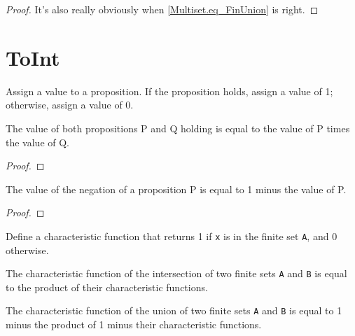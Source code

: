 \begin{proof}
    \leanok
    It's also really obviously when \ref{Multiset.eq_FinUnion} is right.
\end{proof}
\section{ToInt}

\begin{definition}\label{toInt}
  \leanok
  Assign a value to a proposition. If the proposition holds, assign a value of 1; otherwise, assign a value of 0.
\end{definition}

\begin{lemma}\label{toInt_and}
  \leanok
  The value of both propositions P and Q holding is equal to the value of P times the value of Q.
\end{lemma}

\begin{proof}
  \leanok
\end{proof}

\begin{lemma}\label{toInt_not}
  \leanok
  The value of the negation of a proposition P is equal to 1 minus the value of P.
\end{lemma}

\begin{proof}
  \leanok
\end{proof}

\begin{definition}\label{char_fun}
  \leanok
  Define a characteristic function that returns 1 if \verb|x| is in the finite set \verb|A|, and 0 otherwise.
\end{definition}

\begin{lemma}\label{char_fun_inter}
  The characteristic function of the intersection of two finite sets \verb|A| and \verb|B| is equal to the product of their characteristic functions.
\end{lemma}

\begin{lemma}\label{char_fun_union}
  The characteristic function of the union of two finite sets \verb|A| and \verb|B| is equal to 1 minus the product of 1 minus their characteristic functions.
\end{lemma}

